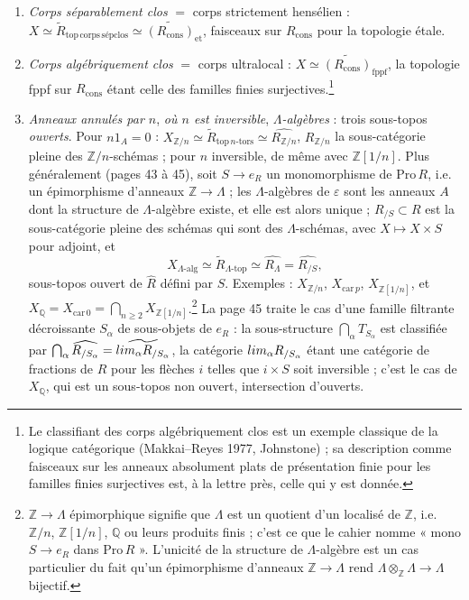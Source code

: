 \documentclass[11pt,a4paper]{article}
\begin{document}
\begin{enumerate}
\item[14)] \emph{Corps séparablement clos} $=$ corps strictement hensélien :
$X \simeq \widetilde{R}_{\mathrm{top\,corps\,sépclos}} \simeq
\widetilde{(R_{\mathrm{cons}})}_{\mathrm{et}}$, faisceaux sur $R_{\mathrm{cons}}$
pour la topologie étale.

\item[15)] \emph{Corps algébriquement clos} $=$ corps ultralocal : $X \simeq
\widetilde{(R_{\mathrm{cons}})}_{\mathrm{fppf}}$, la topologie fppf sur
$R_{\mathrm{cons}}$ étant celle des familles finies surjectives.\footnote{Le
classifiant des corps algébriquement clos est un exemple classique de la
logique catégorique (Makkai--Reyes 1977, Johnstone) ; sa description
comme faisceaux sur les anneaux absolument plats de présentation finie
pour les familles finies surjectives est, à la lettre près, celle qui y
est donnée.}

\item[16)] \emph{Anneaux annulés par $n$}, \emph{où $n$ est inversible},
\emph{$\Lambda$-algèbres} : trois sous-topos \emph{ouverts}. Pour $n1_{A} =
0$ : $X_{\mathbb{Z}/n} \simeq \widetilde{R}_{\mathrm{top}\,n\text{-tors}}
\simeq \widehat{R_{\mathbb{Z}/n}}$, $R_{\mathbb{Z}/n}$ la sous-catégorie
pleine des $\mathbb{Z}/n$-schémas ; pour $n$ inversible, de même avec
$\mathbb{Z}[1/n]$. Plus généralement (pages 43 à 45), soit $S \to e_{R}$
un monomorphisme de $\mathrm{Pro}\,R$, i.e. un épimorphisme d'anneaux
$\mathbb{Z} \to \Lambda$ ; les $\Lambda$-algèbres de $\varepsilon$ sont les
anneaux $A$ dont la structure de $\Lambda$-algèbre existe, et elle est
alors unique ; $R_{/S} \subset R$ est la sous-catégorie pleine des schémas
qui sont des $\Lambda$-schémas, avec $X \mapsto X \times S$ pour adjoint,
et
\[
X_{\Lambda\text{-alg}} \simeq \widetilde{R}_{\Lambda\text{-top}} \simeq
\widehat{R_{\Lambda}} = \widehat{R_{/S}},
\]
sous-topos ouvert de $\widehat{R}$ défini par $S$. Exemples : $X_{\mathbb{Z}
/n}$, $X_{\mathrm{car}\,p}$, $X_{\mathbb{Z}[1/n]}$, et $X_{\mathbb{Q}} =
X_{\mathrm{car}\,0} = \bigcap_{n \geqslant 2} X_{\mathbb{Z}[1/n]}$.\footnote{
$\mathbb{Z} \to \Lambda$ épimorphique signifie que $\Lambda$ est un
quotient d'un localisé de $\mathbb{Z}$, i.e. $\mathbb{Z}/n$, $\mathbb{Z}
[1/n]$, $\mathbb{Q}$ ou leurs produits finis ; c'est ce que le cahier
nomme « mono $S \to e_{R}$ dans $\mathrm{Pro}\,R$ ». L'unicité de la
structure de $\Lambda$-algèbre est un cas particulier du fait qu'un
épimorphisme d'anneaux $\mathbb{Z} \to \Lambda$ rend $\Lambda \otimes_{
\mathbb{Z}} \Lambda \to \Lambda$ bijectif.} La page 45 traite le cas d'une
famille filtrante décroissante $S_{\alpha}$ de sous-objets de $e_{R}$ : la
sous-structure $\bigcap_{\alpha} T_{S_{\alpha}}$ est classifiée par $\bigcap
_{\alpha} \widehat{R_{/S_{\alpha}}} = \widetilde{\varprojlim_{\alpha}
R_{/S_{\alpha}}}$, la catégorie $\varprojlim_{\alpha} R_{/S_{\alpha}}$
étant une catégorie de fractions de $R$ pour les flèches $i$ telles que $i
\times S$ soit inversible ; c'est le cas de $X_{\mathbb{Q}}$, qui est un
sous-topos non ouvert, intersection d'ouverts.


\end{enumerate}
\end{document}
